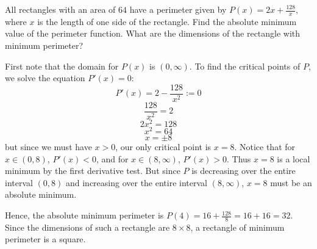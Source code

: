 \documentclass[nooutcomes]{ximera}
\begin{document}
			
			

\begin{problem}
All rectangles with an area of $64$ have a perimeter given by $P(x)=2x+\frac{128}{x}$, where $x$ is the length of one side of the rectangle.  Find the absolute minimum value of the perimeter function.  What are the dimensions of the rectangle with minimum perimeter?   
		\begin{freeResponse}
		First note that the domain for $P(x)$ is $(0,\infty)$.  To find the critical points of $P$, we solve the equation $P'(x) = 0$:
		$$ P'(x) = 2 - \frac{128}{x^2} := 0 $$
		$$ \frac{128}{x^2} = 2 $$
		$$ 2x^2 = 128 $$
		$$ x^2 = 64 $$
		$$ x = \pm 8 $$
		but since we must have $x>0$, our only critical point is $x=8$.  Notice that for $x \in (0,8)$, $P'(x) < 0$, and for $x \in (8, \infty)$, $P'(x) > 0$.  Thus $x=8$ is a local minimum by the first derivative test.  But since $P$ is decreasing over the entire interval $(0,8)$ and increasing over the entire interval $(8,\infty)$, $x=8$ must be an absolute minimum.
		
		Hence, the absolute minimum perimeter is $P(4) = 16 + \frac{128}{8} = 16 + 16 = 32$.  Since the dimensions of such a rectangle are $8 \times 8$, a rectangle of minimum perimeter is a square.
		\end{freeResponse}
			
			
		
\end{problem}
\end{document}
